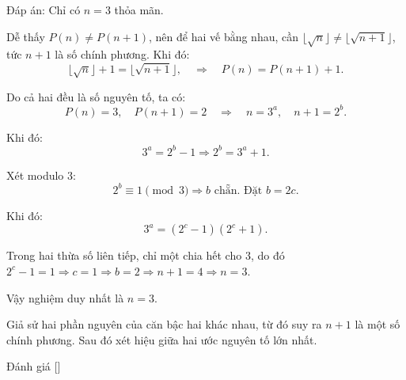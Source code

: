 \ifshowproblemandsoln
\ifshowproblem{}
\fi

\ifshowsoln
\begin{soln}\footnotemark
    Đáp án: Chỉ có \( n = 3 \) thỏa mãn.

    Dễ thấy \( P(n) \ne P(n+1) \), nên để hai vế bằng nhau, cần \( \lfloor \sqrt{n} \rfloor \ne \lfloor \sqrt{n+1} \rfloor \), tức \( n + 1 \) là số chính phương.
    Khi đó:
    \[
        \lfloor \sqrt{n} \rfloor + 1 = \lfloor \sqrt{n+1} \rfloor, \quad \Rightarrow \quad P(n) = P(n+1) + 1.
    \]
    
    Do cả hai đều là số nguyên tố, ta có:
    \[
        P(n) = 3,\quad P(n+1) = 2 \quad \Rightarrow \quad n = 3^a,\quad n + 1 = 2^b.
    \]
    
    Khi đó:
    \[
        3^a = 2^b - 1 \Rightarrow 2^b = 3^a + 1.
    \]

    Xét modulo 3:
    \[
        2^b \equiv 1 \pmod{3} \Rightarrow b \text{ chẵn. Đặt } b = 2c.
    \]

    Khi đó:
    \[
        3^a = (2^c - 1)(2^c + 1).
    \]

    Trong hai thừa số liên tiếp, chỉ một chia hết cho 3, do đó \( 2^c - 1 = 1 \Rightarrow c = 1 \Rightarrow b = 2 \Rightarrow n + 1 = 4 \Rightarrow n = 3 \).

    Vậy nghiệm duy nhất là \( \boxed{n = 3} \).
\end{soln}
\fi

\ifshowhint
\begin{hint*}
    Giả sử hai phần nguyên của căn bậc hai khác nhau, từ đó suy ra \(n+1\) là một số chính phương. Sau đó xét hiệu giữa hai ước nguyên tố lớn nhất.
\end{hint*}
\fi

\ifshowremark
\begin{remark*}
    Đánh giá [\textbf{}]
\end{remark*}
\newpage
\fi